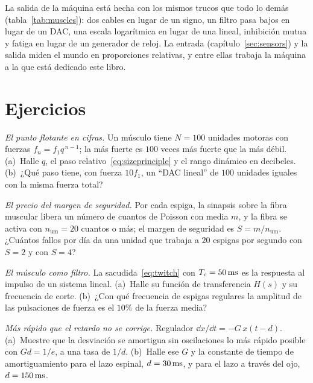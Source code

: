 La salida de la máquina está hecha con los mismos trucos que todo lo demás (tabla~\ref{tab:muscles}): dos cables en lugar de un signo, un filtro pasa bajos en lugar de un DAC, una escala logarítmica en lugar de una lineal, inhibición mutua y fatiga en lugar de un generador de reloj. La entrada (capítulo~\ref{sec:sensors}) y la salida miden el mundo en proporciones relativas, y entre ellas trabaja la máquina a la que está dedicado este libro.

\section{Ejercicios}

\begin{exercise}[\lvlA]
\label{ex:13:1}
\emph{El punto flotante en cifras.} Un músculo tiene $N=100$ unidades motoras con fuerzas $f_n=f_1q^{\,n-1}$; la más fuerte es $100$ veces más fuerte que la más débil. (a)~Halle $q$, el paso relativo~\eqref{eq:sizeprinciple} y el rango dinámico en decibeles. (b)~¿Qué paso tiene, con fuerza $10f_1$, un “DAC lineal” de $100$ unidades iguales con la misma fuerza total?
\end{exercise}

\begin{exercise}[\lvlA]
\label{ex:13:2}
\emph{El precio del margen de seguridad.} Por cada espiga, la sinapsis sobre la fibra muscular libera un número de cuantos de Poisson con media $m$, y la fibra se activa con $n_{\text{um}}=20$ cuantos o más; el margen de seguridad es $S=m/n_{\text{um}}$. ¿Cuántos fallos por día da una unidad que trabaja a $20$ espigas por segundo con $S=2$ y con $S=4$?
\end{exercise}

\begin{exercise}[\lvlB]
\label{ex:13:3}
\emph{El músculo como filtro.} La sacudida~\eqref{eq:twitch} con $T_c=50\,\text{ms}$ es la respuesta al impulso de un sistema lineal. (a)~Halle su función de transferencia $H(s)$ y su frecuencia de corte. (b)~¿Con qué frecuencia de espigas regulares la amplitud de las pulsaciones de fuerza es el $10\%$ de la fuerza media?
\end{exercise}

\begin{exercise}[\lvlB]
\label{ex:13:4}
\emph{Más rápido que el retardo no se corrige.} Regulador $\dd x/\dd t=-G\,x(t-d)$. (a)~Muestre que la desviación se amortigua sin oscilaciones lo más rápido posible con $Gd=1/e$, a una tasa de $1/d$. (b)~Halle ese $G$ y la constante de tiempo de amortiguamiento para el lazo espinal, $d=30\,\text{ms}$, y para el lazo a través del ojo, $d=150\,\text{ms}$.
\end{exercise}

